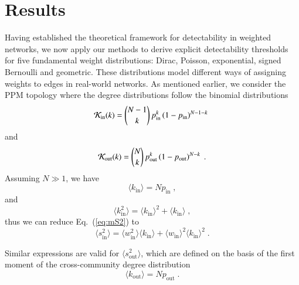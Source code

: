 \documentclass[a4paper,pre,superscriptaddress,floatfix,nofootinbib,twocolumn]{revtex4-1}
\begin{document}
\section*{Results}

Having established the theoretical framework for detectability in weighted networks, we now apply our methods to derive explicit detectability thresholds for five fundamental weight distributions: Dirac, Poisson, exponential, signed Bernoulli and geometric.
These distributions model different ways of assigning weights to edges in real-world networks.
As mentioned earlier,
we consider the PPM topology where the degree distributions follow the binomial distributions
\begin{equation}
{\cal K}_\text{in}(k) = {N-1 \choose k} \, p_{\text{in}}^{k} \left(1 - p_\text{in} \right)^{N-1-k}   \;
    \label{eq:standard1}
\end{equation}
and
\begin{equation}
{\cal K}_\text{out}(k) = {N \choose k} \, p_{\text{out}}^{k} \left(1 - p_\text{out} \right)^{N-k}  \; .
    \label{eq:standard2}
\end{equation}
Assuming $N \gg 1$,
we have
\begin{equation}
  \langle k_{\text{in}} \rangle = N p_{\text{in}} \; ,
\label{eq:kappa_in}
\end{equation}
and
\begin{equation}
\langle k_{\text{in}}^2 \rangle =
\langle k_{\text{in}} \rangle^2 + \langle k_{\text{in}} \rangle \; ,
\label{eq:kappa_in_2}
\end{equation}
thus we can reduce Eq.~(\ref{eq:mS2}) to
\begin{equation}
\langle s_\text{in}^2 \rangle = \langle w^2_\text{in} \rangle
\langle k_{\text{in}} \rangle
+ \langle w_\text{in} \rangle^2
\langle k_{\text{in}} \rangle^2
\; .
 \label{eq:mS2a}
\end{equation}

Similar expressions are valid for $\langle s_\text{out}^2\rangle$, which are defined
on the basis of the first moment of the cross-community degree distribution
\begin{equation}
  \langle k_{\text{out}} \rangle = N p_{\text{out}} \; .
\label{eq:kappa_out}
\end{equation}
\end{document}
